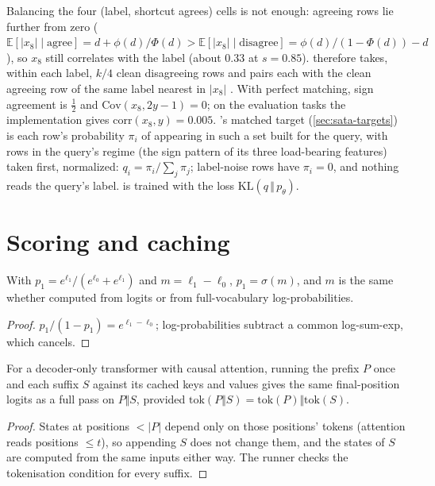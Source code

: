Balancing the four (label, shortcut agrees) cells is not enough: agreeing rows lie further from zero ($\mathbb{E}[|x_8| \mid \text{agree}] = d + \phi(d)/\Phi(d) > \mathbb{E}[|x_8| \mid \text{disagree}] = \phi(d)/(1-\Phi(d)) - d$), so $x_8$ still correlates with the label (about 0.33 at $s = 0.85$).
 therefore takes, within each label, $k/4$ clean disagreeing rows and pairs each with the clean agreeing row of the same label nearest in $|x_8|$ \citep{rubin1973matching,stuart2010matching}.
With perfect matching, sign agreement is $\tfrac12$ and $\mathrm{Cov}(x_8, 2y-1) = 0$; on the evaluation tasks the implementation gives $\mathrm{corr}(x_8, y) = 0.005$.
\sata's matched target (\autoref{sec:sata-targets}) is each row's probability $\pi_i$ of appearing in such a set built for the query, with rows in the query's regime (the sign pattern of its three load-bearing features) taken first, normalized: $q_i = \pi_i / \sum_j \pi_j$; label-noise rows have $\pi_i = 0$, and nothing reads the query's label.
\sata is trained with the loss $\mathrm{KL}(q \,\Vert\, p_\theta)$.

\section{Scoring and caching}

\begin{lemma}[Margin]
With $p_1 = e^{\ell_1}/(e^{\ell_0} + e^{\ell_1})$ and $m = \ell_1 - \ell_0$, $p_1 = \sigma(m)$, and $m$ is the same whether computed from logits or from full-vocabulary log-probabilities.
\end{lemma}
\begin{proof}
$p_1/(1 - p_1) = e^{\ell_1 - \ell_0}$; log-probabilities subtract a common log-sum-exp, which cancels.
\end{proof}

\begin{proposition}
For a decoder-only transformer with causal attention, running the prefix $P$ once and each suffix $S$ against its cached keys and values gives the same final-position logits as a full pass on $P \Vert S$, provided $\mathrm{tok}(P \Vert S) = \mathrm{tok}(P) \Vert \mathrm{tok}(S)$.
\end{proposition}
\begin{proof}
States at positions $< |P|$ depend only on those positions' tokens (attention reads positions $\le t$), so appending $S$ does not change them, and the states of $S$ are computed from the same inputs either way. The runner checks the tokenisation condition for every suffix.
\end{proof}

